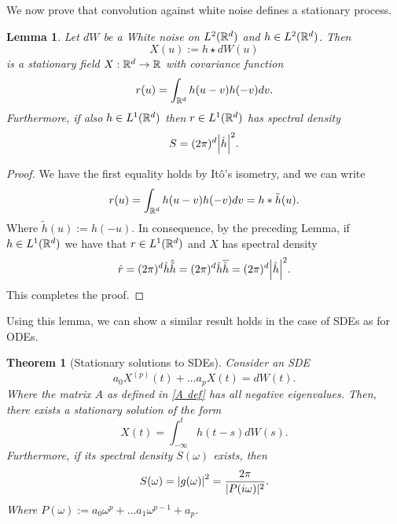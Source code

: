 \documentclass[12pt]{article}
\newtheorem{theorem}{Theorem}
\newtheorem{lemma}{Lemma}
\begin{document}
We now prove that convolution against white noise defines a stationary process.
\begin{lemma}
    Let $dW$ be a White noise on $L^2({\mathbb R}^d)$ and $h\in L^2({\mathbb R}^d)$. Then $$X(u):=h\star dW(u)$$  is a  stationary field $X:{\mathbb R}^d\to{\mathbb R}$ with covariance function
    \begin{equation*}
        r(u)=\int_{{\mathbb R}^d} h(u-v)h(-v)dv.
    \end{equation*}
    Furthermore, if also $h\in L^1({\mathbb R}^d)$ then $r\in L^1({\mathbb R}^d)$ has spectral density
    \begin{equation*}        S=(2\pi)^d{\abs{\hat{h}}^2}.
    \end{equation*}
\end{lemma}


\begin{proof}
    We have the first equality holds by Itô's isometry, and we can write
    \begin{equation*}
        r(u)=\int_{{\mathbb R}^d} h(u-v)h(-v)dv=h* \tilde{h}(u).
    \end{equation*}
    Where $\tilde{h}(u):=h(-u)$. In consequence, by the preceding Lemma, if $h\in L^1({\mathbb R}^d)$ we have that $r\in L^1({\mathbb R}^d)$ and $X$ has spectral density
    \begin{equation*}    \hat{r}=(2\pi)^d\hat{h}\hat{\tilde{h}}=(2\pi)^d\hat{h}\overline{\hat{h}}=(2\pi)^d\abs{\hat{h}}^2.
    \end{equation*}
    This completes the proof.
\end{proof}
Using this lemma, we can show a similar result holds in the case of SDEs as for ODEs.
\begin{theorem}[Stationary solutions to SDEs]
    Consider an SDE     \begin{equation*}
        a_0X^{(p)}(t)+\ldots a_pX(t)=dW(t).
    \end{equation*}
    Where the matrix $A$ as defined in  \eqref{A def} has all negative eigenvalues. Then, there exists a stationary solution of the form $$X(t)=\int_{-\infty}^t h(t-s) dW(s).$$ Furthermore, if its spectral density $S(\omega)$ exists, then    \begin{equation*}
        S(\omega)={\abs{g(\omega)}^2}=\frac{2\pi}{|P(i\omega)|^2}.
    \end{equation*}
    Where $P(\omega):=a_0\omega^p+\ldots a_{1}\omega^{p-1}+a_p$.
\end{theorem}
\end{document}
